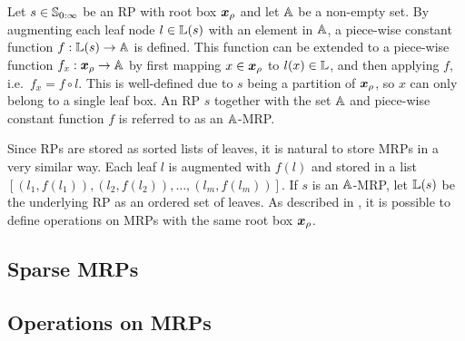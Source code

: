 \documentclass[../mapped-regular-pavings.tex]{subfiles}
\begin{document}
  
  Let $s \in \mathbb{S}_{0:\infty}$ be an RP with root box $\x_\rho$ and let $\mathbb{A}$ be a non-empty set.
  By augmenting each leaf node $l \in \mathbb{L}(s)$ with an element in $\mathbb{A}$, 
  a piece-wise constant function $f: \mathbb{L}(s) \to \mathbb{A}$ is defined.
  This function can be extended to a piece-wise function $f_x: \x_\rho \to \Az$ by 
  first mapping $x \in \x_\rho$ to $l(x) \in \mathbb{L}$, and
  then applying $f$, i.e.~$f_x = f \circ l$.
  This is well-defined due to $s$ being a partition of $\x_\rho$, so 
  $x$ can only belong to a single leaf box.
  An RP $s$ together with the set $\mathbb{A}$ and 
  piece-wise constant function $f$ is referred to as an $\mathbb{A}$-MRP.

  Since RPs are stored as sorted lists of leaves, 
  it is natural to store MRPs in a very similar way.
  Each leaf $l$ is augmented with $f(l)$ and stored in a list 
  $[(l_1, f(l_1)), (l_2, f(l_2)), \dots, (l_m, f(l_m))]$.
  If $s$ is an $\mathbb{A}$-MRP, let $\mathbb{L}(s)$ be the underlying RP as an ordered set of leaves.
  As described in \cite{mrp-raaz-harlow-tucker}, it is possible to 
  define operations on MRPs with the same root box $\x_\rho$.

  \subsection{Sparse MRPs}
    \label{sec:sparse}
    

  \subsection{Operations on MRPs}
    
\end{document}
